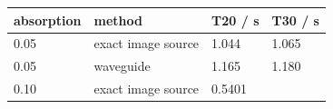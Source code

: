 \documentclass[]{scrreprt}
\begin{document}
\begin{longtable}[c]{@{}llll@{}}
\toprule
\begin{minipage}[b]{0.22\columnwidth}\raggedright\strut
absorption
\strut\end{minipage} &
\begin{minipage}[b]{0.22\columnwidth}\raggedright\strut
method
\strut\end{minipage} &
\begin{minipage}[b]{0.22\columnwidth}\raggedright\strut
T20 / s
\strut\end{minipage} &
\begin{minipage}[b]{0.22\columnwidth}\raggedright\strut
T30 / s
\strut\end{minipage}\tabularnewline
\midrule
\endhead
\begin{minipage}[t]{0.22\columnwidth}\raggedright\strut
0.05
\strut\end{minipage} &
\begin{minipage}[t]{0.22\columnwidth}\raggedright\strut
exact image source
\strut\end{minipage} &
\begin{minipage}[t]{0.22\columnwidth}\raggedright\strut
1.044
\strut\end{minipage} &
\begin{minipage}[t]{0.22\columnwidth}\raggedright\strut
1.065
\strut\end{minipage}\tabularnewline
\begin{minipage}[t]{0.22\columnwidth}\raggedright\strut
0.05
\strut\end{minipage} &
\begin{minipage}[t]{0.22\columnwidth}\raggedright\strut
waveguide
\strut\end{minipage} &
\begin{minipage}[t]{0.22\columnwidth}\raggedright\strut
1.165
\strut\end{minipage} &
\begin{minipage}[t]{0.22\columnwidth}\raggedright\strut
1.180
\strut\end{minipage}\tabularnewline
\begin{minipage}[t]{0.22\columnwidth}\raggedright\strut
0.10
\strut\end{minipage} &
\begin{minipage}[t]{0.22\columnwidth}\raggedright\strut
exact image source
\strut\end{minipage} &
\begin{minipage}[t]{0.22\columnwidth}\raggedright\strut
0.5401
\strut\end{minipage} &

\end{longtable}
\end{document}
